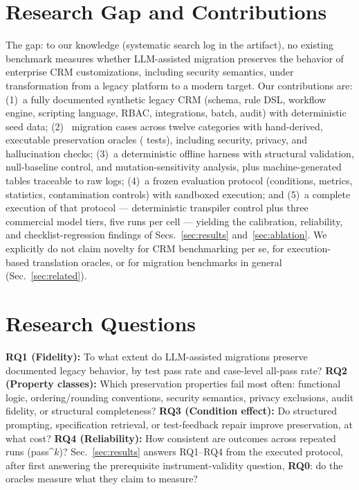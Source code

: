 \documentclass{ieeetj}
\begin{document}
\section{Research Gap and Contributions}
\label{sec:gap}
The gap: to our knowledge (systematic search log in the artifact), no existing benchmark measures whether LLM-assisted migration preserves the behavior
of enterprise CRM customizations, including security semantics, under transformation from a
legacy platform to a modern target. Our contributions are:
(1)~a fully documented synthetic legacy CRM (schema, rule DSL, workflow engine, scripting
language, RBAC, integrations, batch, audit) with deterministic seed data;
(2)~\NumCases{} migration cases across twelve categories with hand-derived, executable
preservation oracles (\NumTests{} tests), including security, privacy, and hallucination
checks;
(3)~a deterministic offline harness with structural validation, null-baseline control, and
mutation-sensitivity analysis, plus machine-generated tables traceable to raw logs;
(4)~a frozen evaluation protocol (conditions, metrics, statistics, contamination controls)
with sandboxed execution; and (5)~a complete execution of that protocol --- deterministic
transpiler control plus three commercial model tiers, five runs per cell --- yielding the
calibration, reliability, and checklist-regression findings of Secs.~\ref{sec:results}
and~\ref{sec:ablation}. We explicitly do not claim novelty for CRM benchmarking per se, for
execution-based translation oracles, or for migration benchmarks in general
(Sec.~\ref{sec:related}).

\section{Research Questions}
\label{sec:rqs}
\textbf{RQ1 (Fidelity):} To what extent do LLM-assisted migrations preserve documented legacy
behavior, by test pass rate and case-level all-pass rate?
\textbf{RQ2 (Property classes):} Which preservation properties fail most often: functional
logic, ordering/rounding conventions, security semantics, privacy exclusions, audit fidelity,
or structural completeness?
\textbf{RQ3 (Condition effect):} Do structured prompting, specification retrieval, or
test-feedback repair improve preservation, at what cost?
\textbf{RQ4 (Reliability):} How consistent are outcomes across repeated runs
(pass\textasciicircum{}$k$)?
Sec.~\ref{sec:results} answers RQ1--RQ4 from the executed protocol, after first answering
the prerequisite instrument-validity question, \textbf{RQ0}: do the oracles measure what
they claim to measure?
\end{document}
